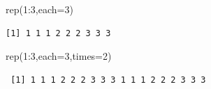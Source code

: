 \documentclass[
  8pt,
  ignorenonframetext,
]{beamer}
\newenvironment{Shaded}{\begin{snugshade}}{\end{snugshade}}
\newcommand{\AttributeTok}[1]{\textcolor[rgb]{0.77,0.63,0.00}{#1}}
\newcommand{\DecValTok}[1]{\textcolor[rgb]{0.00,0.00,0.81}{#1}}
\newcommand{\FunctionTok}[1]{\textcolor[rgb]{0.00,0.00,0.00}{#1}}
\newcommand{\NormalTok}[1]{#1}
\newcommand{\SpecialCharTok}[1]{\textcolor[rgb]{0.00,0.00,0.00}{#1}}
\begin{document}
\begin{frame}[fragile]{}
\begin{Shaded}
\begin{Highlighting}[]
\FunctionTok{rep}\NormalTok{(}\DecValTok{1}\SpecialCharTok{:}\DecValTok{3}\NormalTok{,}\AttributeTok{each=}\DecValTok{3}\NormalTok{)}
\end{Highlighting}
\end{Shaded}

\begin{verbatim}
[1] 1 1 1 2 2 2 3 3 3
\end{verbatim}

\begin{Shaded}
\begin{Highlighting}[]
\FunctionTok{rep}\NormalTok{(}\DecValTok{1}\SpecialCharTok{:}\DecValTok{3}\NormalTok{,}\AttributeTok{each=}\DecValTok{3}\NormalTok{,}\AttributeTok{times=}\DecValTok{2}\NormalTok{)}
\end{Highlighting}
\end{Shaded}

\begin{verbatim}
 [1] 1 1 1 2 2 2 3 3 3 1 1 1 2 2 2 3 3 3
\end{verbatim}
\end{frame}
\end{document}
